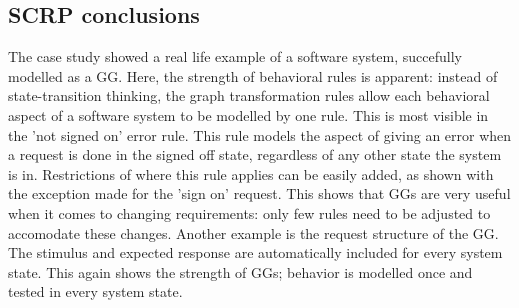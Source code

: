 \subsection{SCRP conclusions}
The case study showed a real life example of a software system, succefully modelled as a GG. Here, the strength of behavioral rules is apparent: instead of state-transition thinking, the graph transformation rules allow each behavioral aspect of a software system to be modelled by one rule. This is most visible in the 'not signed on' error rule. This rule models the aspect of giving an error when a request is done in the signed off state, regardless of any other state the system is in. Restrictions of where this rule applies can be easily added, as shown with the exception made for the 'sign on' request. This shows that GGs are very useful when it comes to changing requirements: only few rules need to be adjusted to accomodate these changes. Another example is the request structure of the GG. The stimulus and expected response are automatically included for every system state. This again shows the strength of GGs; behavior is modelled once and tested in every system state. 
